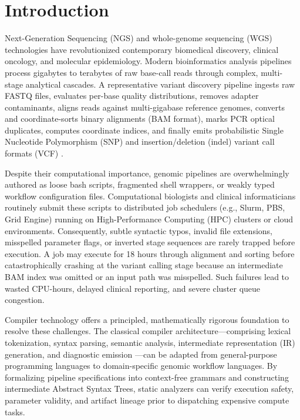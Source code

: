 \documentclass[12pt,a4paper]{article}
\begin{document}
\newpage

\tableofcontents
\newpage

\section{Introduction}

Next-Generation Sequencing (NGS) and whole-genome sequencing (WGS) technologies have revolutionized contemporary biomedical discovery, clinical oncology, and molecular epidemiology. Modern bioinformatics analysis pipelines process gigabytes to terabytes of raw base-call reads through complex, multi-stage analytical cascades. A representative variant discovery pipeline ingests raw FASTQ files, evaluates per-base quality distributions, removes adapter contaminants, aligns reads against multi-gigabase reference genomes, converts and coordinate-sorts binary alignments (BAM format), marks PCR optical duplicates, computes coordinate indices, and finally emits probabilistic Single Nucleotide Polymorphism (SNP) and insertion/deletion (indel) variant call formats (VCF) \cite{mckenna2010,li2009}.

Despite their computational importance, genomic pipelines are overwhelmingly authored as loose bash scripts, fragmented shell wrappers, or weakly typed workflow configuration files. Computational biologists and clinical informaticians routinely submit these scripts to distributed job schedulers (e.g., Slurm, PBS, Grid Engine) running on High-Performance Computing (HPC) clusters or cloud environments. Consequently, subtle syntactic typos, invalid file extensions, misspelled parameter flags, or inverted stage sequences are rarely trapped before execution. A job may execute for 18 hours through alignment and sorting before catastrophically crashing at the variant calling stage because an intermediate BAM index was omitted or an input path was misspelled. Such failures lead to wasted CPU-hours, delayed clinical reporting, and severe cluster queue congestion.

Compiler technology offers a principled, mathematically rigorous foundation to resolve these challenges. The classical compiler architecture---comprising lexical tokenization, syntax parsing, semantic analysis, intermediate representation (IR) generation, and diagnostic emission \cite{aho2006,cooper2011}---can be adapted from general-purpose programming languages to domain-specific genomic workflow languages. By formalizing pipeline specifications into context-free grammars and constructing intermediate Abstract Syntax Trees, static analyzers can verify execution safety, parameter validity, and artifact lineage prior to dispatching expensive compute tasks.
\end{document}
